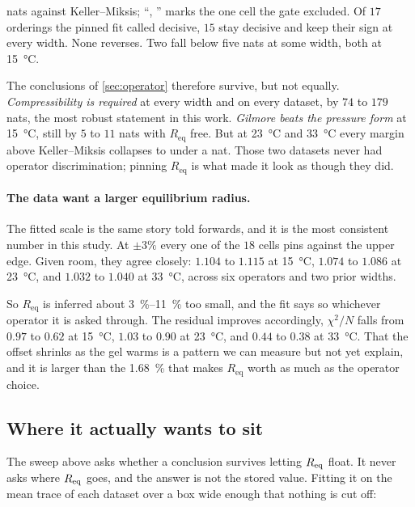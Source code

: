 \documentclass[10pt]{article}
\begin{document}
\noindent nats against Keller--Miksis; ``, '' marks the one cell the gate excluded. Of $17$
orderings the pinned fit called decisive, $15$ stay decisive and keep their sign at every
width. None reverses. Two fall below five nats at some width, both at \SI{15}{\celsius}.

The conclusions of \cref{sec:operator} therefore survive, but not equally. \emph{Compressibility
is required} at every width and on every dataset, by $74$ to $179$ nats, the most robust
statement in this work. \emph{Gilmore beats the pressure form} at \SI{15}{\celsius}, still by
$5$ to $11$ nats with $R_{\mathrm{eq}}$ free. But at \SI{23}{\celsius} and \SI{33}{\celsius}
every margin above Keller--Miksis collapses to under a nat. Those two datasets never had
operator discrimination; pinning $R_{\mathrm{eq}}$ is what made it look as though they did.

\paragraph{The data want a larger equilibrium radius.} The fitted scale is the same story
told forwards, and it is the most consistent number in this study. At $\pm3\%$ every one of
the $18$ cells pins against the upper edge. Given room, they agree closely: $1.104$ to
$1.115$ at \SI{15}{\celsius}, $1.074$ to $1.086$ at \SI{23}{\celsius}, and $1.032$ to $1.040$
at \SI{33}{\celsius}, across six operators and two prior widths.

So $R_{\mathrm{eq}}$ is inferred about \SIrange{3}{11}{\percent} too small, and the fit says
so whichever operator it is asked through. The residual improves accordingly, $\chi^2/N$
falls from $0.97$ to $0.62$ at \SI{15}{\celsius}, $1.03$ to $0.90$ at \SI{23}{\celsius}, and
$0.44$ to $0.38$ at \SI{33}{\celsius}. That the offset shrinks as the gel warms is a pattern
we can measure but not yet explain, and it is larger than the \SI{1.68}{\percent} that makes
$R_{\mathrm{eq}}$ worth as much as the operator choice.

\subsection*{Where it actually wants to sit}

The sweep above asks whether a conclusion survives letting $R_{\rm eq}$ float. It never asks
where $R_{\rm eq}$ goes, and the answer is not the stored value. Fitting it on the mean trace of
each dataset over a box wide enough that nothing is cut off:
\end{document}
